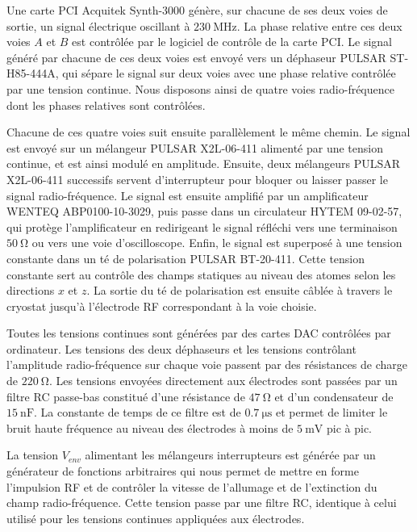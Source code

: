 Une carte PCI Acquitek Synth-3000 génère, sur chacune de ses deux voies de sortie, un signal électrique oscillant à $\SI{230}{\MHz}$.
La phase relative entre ces deux voies $A$ et $B$ est contrôlée par le logiciel de contrôle de la carte PCI.
Le signal généré par chacune de ces deux voies est envoyé vers un déphaseur PULSAR ST-H85-444A, qui sépare le signal sur deux voies avec une phase relative contrôlée par une tension continue.
Nous disposons ainsi de quatre voies radio-fréquence dont les phases relatives sont contrôlées.

Chacune de ces quatre voies suit ensuite parallèlement le même chemin.
Le signal est envoyé sur un mélangeur PULSAR X2L-06-411 alimenté par une tension continue, et est ainsi modulé en amplitude.
Ensuite, deux mélangeurs PULSAR X2L-06-411 successifs servent d'interrupteur pour bloquer ou laisser passer le signal radio-fréquence.
Le signal est ensuite amplifié par un amplificateur WENTEQ ABP0100-10-3029, puis passe dans un circulateur HYTEM 09-02-57, qui protège l'amplificateur en redirigeant le signal réfléchi vers une terminaison $\SI{50}{\ohm}$ ou vers une voie d'oscilloscope.
Enfin, le signal est superposé à une tension constante dans un té de polarisation PULSAR BT-20-411.
Cette tension constante sert au contrôle des champs statiques au niveau des atomes selon les directions $x$ et $z$.
La sortie du té de polarisation est ensuite câblée à travers le cryostat jusqu'à l'électrode RF correspondant à la voie choisie.

Toutes les tensions continues sont générées par des cartes DAC contrôlées par ordinateur.
Les tensions des deux déphaseurs et les tensions contrôlant l'amplitude radio-fréquence sur chaque voie passent par des résistances de charge de $\SI{220}{\ohm}$.
Les tensions envoyées directement aux électrodes sont passées par un filtre RC passe-bas constitué d'une résistance de $\SI{47}{\ohm}$ et d'un condensateur de $\SI{15}{\nano\farad}$.
La constante de temps de ce filtre est de $\SI{0.7}{\us}$ et permet de limiter le bruit haute fréquence au niveau des électrodes à moins de $\SI{5}{\milli\volt}$ pic à pic.

La tension $V_{env}$ alimentant les mélangeurs \og interrupteurs \fg{} est générée par un générateur de fonctions arbitraires qui nous permet de mettre en forme l'impulsion RF et de contrôler la vitesse de l'allumage et de l'extinction du champ radio-fréquence.
Cette tension passe par une filtre RC, identique à celui utilisé pour les tensions continues appliquées aux électrodes.


